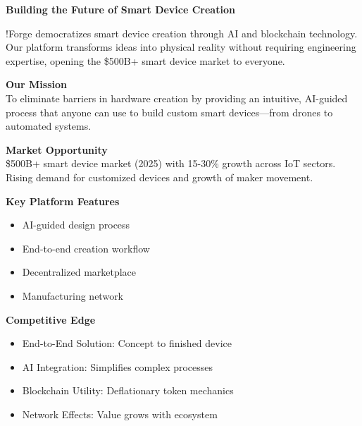 \vspace{0.3cm}
\begin{center}
\textcolor{fabPrimary}{\Large\textbf{Building the Future of Smart Device Creation}}
\end{center}

\vspace{0.2cm}
\noindent !Forge democratizes smart device creation through AI and blockchain technology. Our platform transforms ideas into physical reality without requiring engineering expertise, opening the \$500B+ smart device market to everyone.

\vspace{0.2cm}
\begin{multicols}{2}
\textcolor{fabPrimary}{\textbf{Our Mission}}\\
\noindent To eliminate barriers in hardware creation by providing an intuitive, AI-guided process that anyone can use to build custom smart devices—from drones to automated systems.

\columnbreak

\textcolor{fabPrimary}{\textbf{Market Opportunity}}\\
\noindent \$500B+ smart device market (2025) with 15-30\% growth across IoT sectors. Rising demand for customized devices and growth of maker movement.
\end{multicols}

\vspace{0.2cm}
\begin{multicols}{2}
\textcolor{fabRed}{\textbf{Key Platform Features}}
\vspace{0.05cm}
\begin{itemize}[leftmargin=*, topsep=0pt, itemsep=0pt]
    \item AI-guided design process
    \item End-to-end creation workflow
    \item Decentralized marketplace
    \item Manufacturing network
\end{itemize}

\columnbreak

\textcolor{fabRed}{\textbf{Competitive Edge}}
\vspace{0.05cm}
\begin{itemize}[leftmargin=*, topsep=0pt, itemsep=0pt]
    \item End-to-End Solution: Concept to finished device
    \item AI Integration: Simplifies complex processes
    \item Blockchain Utility: Deflationary token mechanics
    \item Network Effects: Value grows with ecosystem
\end{itemize}
\end{multicols}

